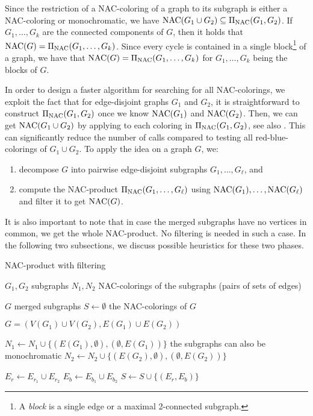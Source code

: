 Since the restriction of a NAC-coloring of a graph
to its subgraph is either a NAC-coloring or monochromatic,
we have $\operatorname{NAC}(G_{1} \cup G_{2}) \subseteq \operatorname{\Pi_{\operatorname{NAC}}}(G_{1}, G_{2})$.
If~$G_1, \dots, G_k$ are the connected components of $G$,
then it holds that $\operatorname{NAC}(G) = \operatorname{\Pi_{\operatorname{NAC}}}(G_1,\ldots, G_k)$.
Since every cycle is contained in a single
block\footnote{A \emph{block} is a single edge or a maximal 2-connected subgraph.}
of a graph, we have that $\operatorname{NAC}(G) = \operatorname{\Pi_{\operatorname{NAC}}}(G_1,\ldots, G_k)$
for $G_1,\ldots, G_k$ being the blocks of $G$.

In order to design a faster algorithm for searching for all NAC-colorings,
we exploit the fact that for edge-disjoint graphs $G_1$ and $G_2$,
it is straightforward to construct $\operatorname{\Pi_{\operatorname{NAC}}}(G_{1}, G_{2})$ once we know $\operatorname{NAC}(G_1)$ and $\operatorname{NAC}(G_2)$.
Then, we can get $\operatorname{NAC}(G_{1} \cup G_{2})$ by applying \IsNACColoring{}
to each coloring in $\operatorname{\Pi_{\operatorname{NAC}}}(G_{1}, G_{2})$, see also .
This can significantly reduce the number of \IsNACColoring{} calls
compared to testing all red-blue-colorings of $G_{1} \cup G_{2}$.
To apply the idea on a graph $G$, we:
%
\begin{enumerate}
	\item decompose $G$ into pairwise edge-disjoint subgraphs $G_1, \ldots, G_\ell$, and
	\item compute the NAC-product $\operatorname{\Pi_{\operatorname{NAC}}}(G_1, \dots, G_\ell)$ using $\operatorname{NAC}(G_1), \ldots, \operatorname{NAC}(G_\ell)$
	      and filter it to get $\operatorname{NAC}(G)$.
\end{enumerate}
%
It is also important to note that in case the merged subgraphs
have no vertices in common, we get the whole NAC-product.
No filtering is needed in such a case.
%
In the following two subsections, we discuss possible heuristics
for these two phases.

\begin{algorithm}
	\caption{NAC-product with filtering}%
	\label{alg:coloring_product}
	\begin{algorithmic}[1]
		\Require{} $G_1, G_2$
		\Comment{} subgraphs
		\Require{} $N_1, N_2$
		\Comment{} NAC-colorings of the subgraphs (pairs of sets of edges)

		\Ensure{} $G$
		\Comment{} merged subgraphs
		\Ensure{} $S \gets \emptyset$
		\Comment{} the NAC-colorings of $G$

		\State{} $G = (V(G_1)\cup V(G_2), E(G_1) \cup E(G_2))$

		\State{} $N_1 \gets N_1 \cup \{(E(G_1), \emptyset), (\emptyset, E(G_1))\}$
		\Comment{} the subgraphs can also be monochromatic
		\State{} $N_2 \gets N_2 \cup \{(E(G_2), \emptyset), (\emptyset, E(G_2))\}$

		\State{} $E_r \gets E_{r_{1}} \cup E_{r_{2}}$
		\State{} $E_b \gets E_{b_{1}} \cup E_{b_{2}}$
		\State{} $S \gets S \cup \{(E_r, E_b)\}$
		\EndIf{}
		\EndFor{}
		\EndFor{}
	\end{algorithmic}
\end{algorithm}

